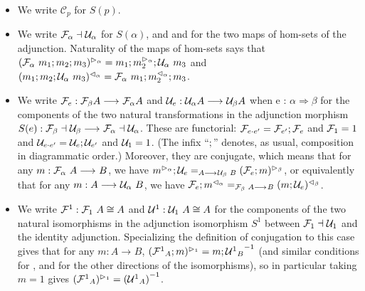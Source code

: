 \documentclass{drl-common/llncs}
\newcommand{\inv}[1]{\ensuremath{{#1}^{-1}}}
\newcommand{\C}{\ensuremath{\mathcal{C}}}
\newcommand{\la}{\ensuremath{\dashv}}
\newcommand{\arrow}[3]{\ensuremath{#2 \longrightarrow_{#1} #3}}
\newcommand{\tc}[2]{\ensuremath{#1 \Rightarrow #2}}
\newcommand\compv[2]{\ensuremath{#1 \cdot #2}}
\begin{document}
\begin{itemize}
\item We write $\C_p$ for $S(p)$.

\item We write $\semFo{\alpha}{} \la \semUo{\alpha}$ for $S(\alpha)$, and
  \semltor{-}{\alpha} and \semrtol{-}{\alpha} for the two maps of hom-sets
  of the adjunction.
  Naturality of the maps of hom-sets says that 
  $(\mathcal{F}_{\alpha} \,\, m_1;m_2;m_3)^{\vartriangleright_{\alpha}} = m_1;m_2^{\vartriangleright_{\alpha}};\mathcal{U}_{\alpha} \,\, m_3$
  and 
  $(m_1;m_2;\mathcal{U}_{\alpha} \,\, m_3)^{\vartriangleleft_{\alpha}} = \mathcal{F}_{\alpha} \,\, m_1;{m_2^{\vartriangleleft_{\alpha}}};{m_3}$.  

\item We write $\semFo{e} : \arrow{}{\semFo \beta A}{\semFo \alpha A}$
and $\semUo{e} : \arrow{}{\semUo \alpha A}{\semUo \beta A}$
 when {e : \tc{\alpha}{\beta}}
for the components of the two natural transformations in the adjunction 
morphism $S(e) : \arrow{}{\semFo{\beta}{} \la \semUo{\beta}} {\semFo{\alpha}{} \la \semUo{\alpha}}$.  
These are functorial: $\semFo{\compv{e}{e'}} = \semFo{e'};\semFo{e}$
and ${\mathcal{F}_{1}} = 1$ and 
$\semUo{\compv{e}{e'}} = \semUo{e};\semUo{e'}$
and $\mathcal{U}_{1} = 1$.
(The infix ``$;$'' denotes, as usual, composition in diagrammatic order.)
Moreover, they are conjugate, which means 
that for any $m : \arrow{}{\semF{\alpha}{A}}{B}$, we have
$\semltor{m}{\alpha};\semUo{e} =_{\arrow{}{A}{\semU{\beta}{B}}} \semltor{(\semFo{e};m)}{\beta}$,
or equivalently that 
for any $m : \arrow{}{{A}}{\semU{\alpha} B}$, we have
$\semFo{e};\semrtol{m}{\alpha} =_{\arrow{}{\semF \beta A}{B}} \semrtol{(m;\semUo{e})}{\beta}$.

\item We write ${\mathcal{F}^1} : \mathcal{F}_{1} \,\, A \cong A$ and ${\mathcal{U}^1} :
  \mathcal{U}_{1} \,\, A \cong A$ for the components of the two natural isomorphisms
  in the adjunction isomorphism $S^1$ between $\semFo{1}{} \la
  \semUo{1}$ and the identity adjunction.  Specializing the definition
  of conjugation to this case gives that for any $m : \arrow{}{A}{B}$,
  $\ltor{(\semFone_A;m)}{1} = m;\inv{\semUone_B}$ (and similar
  conditions for \rtol{-}{}, and for the other directions of the
  isomorphisms), so in particular taking $m = 1$ gives
  $\ltor{(\semFone_A)}{{1}} = \inv{(\semUone_A)}$.


\end{itemize}
\end{document}
